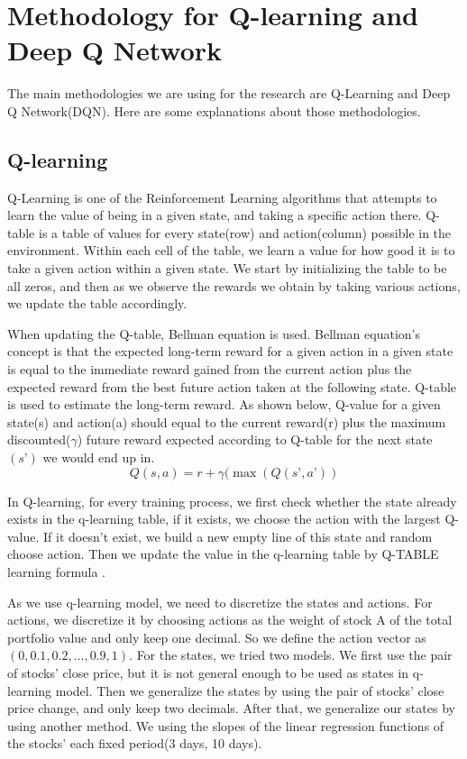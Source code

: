 \chapter{Methodology for Q-learning and Deep Q Network}
\label{Ch:methodology}

The main methodologies we are using for the research are Q-Learning and Deep Q Network(DQN). Here are some explanations about those methodologies.

\section{Q-learning}
Q-Learning is one of the Reinforcement Learning algorithms that attempts to learn the value of being in a given state, and taking a specific action there. Q-table is a table of values for every state(row) and action(column) possible in the environment. Within each cell of the table, we learn a value for how good it is to take a given action within a given state.  We start by initializing the table to be all zeros, and then as we observe the rewards we obtain by taking various actions, we update the table accordingly.

When updating the Q-table, Bellman equation is used. Bellman equation’s concept is that the expected long-term reward for a given action in a given state is equal to the immediate reward gained from the current action plus the expected reward from the best future action taken at the following state. Q-table is used to estimate the long-term reward. As shown below, Q-value for a given state(s) and action(a) should equal to the current reward(r) plus the maximum discounted($\gamma$) future reward expected according to Q-table for the next state$(s’)$ we would end up in. 
$$Q(s,a) = r + \gamma (\max (Q(s’,a’))$$

In Q-learning, for every training process, we first check whether the state already exists in the q-learning table, if it exists, we choose the action with the largest Q-value. If it doesn’t exist, we build a new empty line of this state and random choose action. Then we update the value in the q-learning table by  Q-TABLE learning formula .

As we use q-learning model, we need to discretize the states and actions. For actions, we discretize it by choosing actions as the weight of stock A of the total portfolio value and only keep one decimal. So we define the action vector as $(0, 0.1, 0.2, …, 0.9, 1)$. For the states, we tried two models. We first use the pair of stocks’ close price, but it is not general enough to be used as states in q-learning model. Then we generalize the states by using the pair of stocks’ close price change, and only keep two decimals. After that, we generalize our states by using another method. We using the slopes of the linear regression functions of the stocks’ each fixed period(3 days, 10 days).

